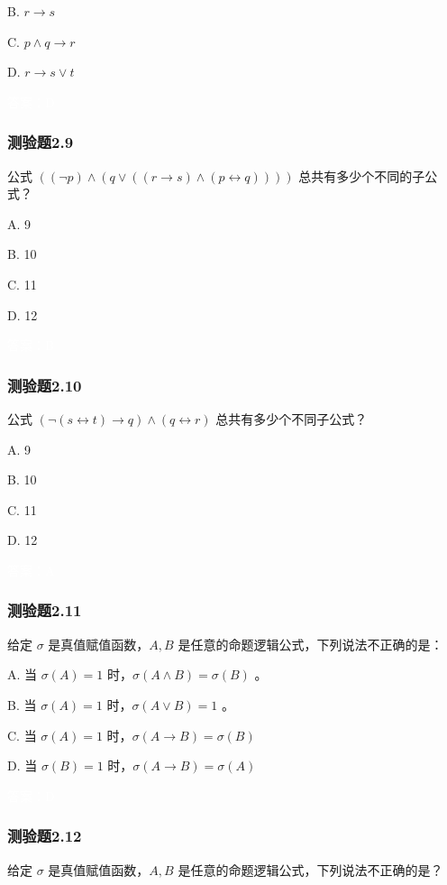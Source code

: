 \documentclass[UTF8, heading=true]{ctexart}
\begin{document}
B. $r \rightarrow s$

C. $p \wedge q \rightarrow r$

D. $r \rightarrow s \vee t$

\textcolor{white}{答案：D}


\subsubsection{测验题2.9}

公式 $((\neg p) \wedge(q \vee((r \rightarrow s) \wedge(p \leftrightarrow q))))$ 总共有多少个不同的子公式？

A. 9

B. 10

C. 11

D. 12

\textcolor{white}{答案：B}

\subsubsection{测验题2.10}

公式 $(\neg(s \leftrightarrow t) \rightarrow q) \wedge(q \leftrightarrow r)$ 总共有多少个不同子公式？

A. 9

B. 10

C. 11

D. 12

\textcolor{white}{答案：A}

\subsubsection{测验题2.11}

给定 $\sigma$ 是真值赋值函数，$A, B$ 是任意的命题逻辑公式，下列说法不正确的是：

A. 当 $\sigma(A)=1$ 时，$\sigma(A \wedge B)=\sigma(B)$ 。

B. 当 $\sigma(A)=1$ 时，$\sigma(A \vee B)=1$ 。

C. 当 $\sigma(A)=1$ 时，$\sigma(A \rightarrow B)=\sigma(B)$

D.  当 $\sigma(B)=1$ 时，$\sigma(A \rightarrow B)=\sigma(A)$

\textcolor{white}{答案：D}

\subsubsection{测验题2.12}

给定 $\sigma$ 是真值赋值函数，$A, B$ 是任意的命题逻辑公式，下列说法不正确的是？
\end{document}
